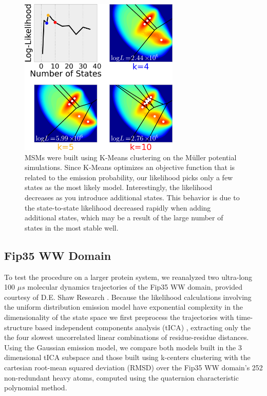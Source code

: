 \documentclass[twocolumn,floatfix,nofootinbib,aps]{revtex4-1}
\begin{document}
\begin{figure}
\centering
\includegraphics[width=3in]{figs/kmeans_vor_like.png}
\caption{MSMs were built using K-Means clustering on the M\"uller potential simulations. Since K-Means optimizes an objective function that is related to the emission probability, our likelihood picks only a few states as the most likely model. Interestingly, the likelihood decreases as you introduce additional states. This behavior is due to the state-to-state likelihood decreased rapidly when adding additional states, which may be a result of the large number of states in the most stable well.}
\label{fig:kmeans_mull}
\end{figure}

\subsection{Fip35 WW Domain}

To test the procedure on a larger protein system, we reanalyzed two ultra-long 100 $\mu s$ molecular dynamics trajectories of the Fip35 WW domain\cite{Liu2008Experimental}, provided courtesy of D.E. Shaw Research \cite{Shaw2010Atomic}. Because the likelihood calculations involving the uniform distribution emission model have exponential complexity in the dimensionality of the state space we first preprocess the trajectories with time-structure based independent components analysis (tICA) \cite{Schwantes2013Improvements, Perez2013Identification}, extracting only the the four slowest uncorrelated linear combinations of residue-residue distances. Using the Gaussian emission model, we compare both models built in the 3 dimensional tICA subspace and those built using k-centers clustering with the cartesian root-mean squared deviation (RMSD) over the Fip35 WW domain's 252 non-redundant heavy atoms, computed using the quaternion characteristic polynomial method\cite{Theobald2005Rapid}.
\end{document}

